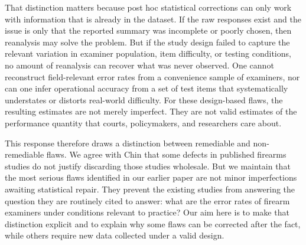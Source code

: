 \documentclass[11pt, oneside]{article}   	%
\begin{document}
That distinction matters because post hoc statistical corrections can only work with information that is already in the dataset. If the raw responses exist and the issue is only that the reported summary was incomplete or poorly chosen, then reanalysis may solve the problem. But if the study design failed to capture the relevant variation in examiner population, item difficulty, or testing conditions, no amount of reanalysis can recover what was never observed. One cannot reconstruct field-relevant error rates from a convenience sample of examiners, nor can one infer operational accuracy from a set of test items that systematically understates or distorts real-world difficulty. For these design-based flaws, the resulting estimates are not merely imperfect. They are not valid estimates of the performance quantity that courts, policymakers, and researchers care about.

This response therefore draws a distinction between remediable and non-remediable flaws. We agree with Chin that some defects in published firearms studies do not justify discarding those studies wholesale. But we maintain that the most serious flaws identified in our earlier paper are not minor imperfections awaiting statistical repair. They prevent the existing studies from answering the question they are routinely cited to answer: what are the error rates of firearm examiners under conditions relevant to practice? Our aim here is to make that distinction explicit and to explain why some flaws can be corrected after the fact, while others require new data collected under a valid design.





\end{document}

